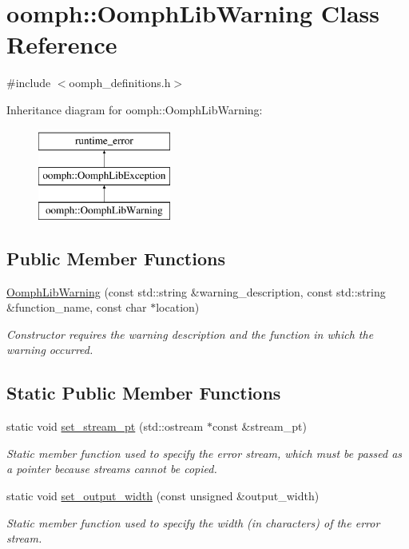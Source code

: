 \hypertarget{classoomph_1_1OomphLibWarning}{}\section{oomph\+:\+:Oomph\+Lib\+Warning Class Reference}
\label{classoomph_1_1OomphLibWarning}


{\ttfamily \#include $<$oomph\+\_\+definitions.\+h$>$}

Inheritance diagram for oomph\+:\+:Oomph\+Lib\+Warning\+:\begin{figure}[H]
\begin{center}
\leavevmode
\includegraphics[height=3.000000cm]{classoomph_1_1OomphLibWarning}
\end{center}
\end{figure}
\subsection*{Public Member Functions}
\begin{DoxyCompactItemize}
\item 
\hyperlink{classoomph_1_1OomphLibWarning_ae85fe4479e40f450a797074549c09ed8}{Oomph\+Lib\+Warning} (const std\+::string \&warning\+\_\+description, const std\+::string \&function\+\_\+name, const char $\ast$location)
\begin{DoxyCompactList}\small\item\em Constructor requires the warning description and the function in which the warning occurred. \end{DoxyCompactList}\end{DoxyCompactItemize}
\subsection*{Static Public Member Functions}
\begin{DoxyCompactItemize}
\item 
static void \hyperlink{classoomph_1_1OomphLibWarning_ade3b8f1484c2f91b0f2c7723ce056e93}{set\+\_\+stream\+\_\+pt} (std\+::ostream $\ast$const \&stream\+\_\+pt)
\begin{DoxyCompactList}\small\item\em Static member function used to specify the error stream, which must be passed as a pointer because streams cannot be copied. \end{DoxyCompactList}\item 
static void \hyperlink{classoomph_1_1OomphLibWarning_a7e6ae645796506845779005aba0b4a7a}{set\+\_\+output\+\_\+width} (const unsigned \&output\+\_\+width)
\begin{DoxyCompactList}\small\item\em Static member function used to specify the width (in characters) of the error stream. \end{DoxyCompactList}\end{DoxyCompactItemize}
